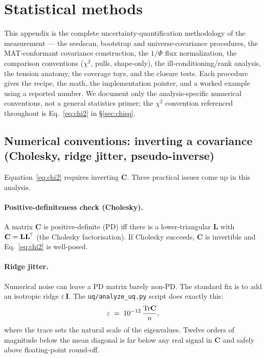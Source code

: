 \section{Statistical methods}
\label{app:statmethods}
\label{app:methods}

This appendix is the complete uncertainty-quantification methodology of the
measurement --- the seedscan, bootstrap and universe-covariance procedures,
the MAT-conformant covariance construction, the $1/\Phi$ flux normalization,
the comparison conventions ($\chi^{2}$, pulls, shape-only), the
ill-conditioning/rank analysis, the tension anatomy, the coverage toys, and
the closure tests. Each procedure gives the recipe, the math, the
implementation pointer, and a worked example using a reported number. We
document only the analysis-specific numerical conventions, not a general
statistics primer; the $\chi^{2}$ convention referenced throughout is
Eq.~\eqref{eq:chi2} in \S\ref{sec:chisq}.


\subsection{Numerical conventions: inverting a covariance (Cholesky, ridge jitter, pseudo-inverse)}
\label{sec:invert}

Equation~\eqref{eq:chi2} requires inverting $\mathbf{C}$. Three
practical issues come up in this analysis.

\paragraph{Positive-definiteness check (Cholesky).}
A matrix $\mathbf{C}$ is positive-definite (PD) iff there is a
lower-triangular $\mathbf{L}$ with $\mathbf{C}=\mathbf{L}\mathbf{L}^{\!\top}$
(the Cholesky factorisation). If Cholesky succeeds, $\mathbf{C}$ is
invertible and Eq.~\eqref{eq:chi2} is well-posed.

\paragraph{Ridge jitter.}
Numerical noise can leave a PD matrix barely non-PD. The standard fix
is to add an isotropic ridge $\varepsilon\, \mathbf{I}$. The
\texttt{uq/analyze\_uq.py} script does exactly this:
\begin{equation}
\varepsilon \;=\; 10^{-12} \,\frac{\mathrm{Tr}\mathbf{C}}{n},
\end{equation}
where the trace sets the natural scale of the eigenvalues. Twelve
orders of magnitude below the mean diagonal is far below any real
signal in $\mathbf{C}$ and safely above floating-point round-off.

